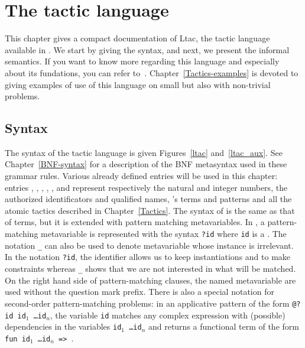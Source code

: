 \chapter[The tactic language]{The tactic language\label{TacticLanguage}}


This chapter gives a compact documentation of Ltac, the tactic
language available in {\Coq}. We start by giving the syntax, and next,
we present the informal semantics. If you want to know more regarding
this language and especially about its fundations, you can refer
to~\cite{Del00}. Chapter~\ref{Tactics-examples} is devoted to giving
examples of use of this language on small but also with non-trivial
problems.


\section{Syntax}

\def\tacexpr{\textrm{\textsl{expr}}}
\def\tacexprlow{\textrm{\textsl{tacexpr$_1$}}}
\def\tacexprinf{\textrm{\textsl{tacexpr$_2$}}}
\def\tacexprpref{\textrm{\textsl{tacexpr$_3$}}}
\def\atom{\textrm{\textsl{atom}}}
\def\recclause{\textrm{\textsl{rec\_clause}}}
\def\letclause{\textrm{\textsl{let\_clause}}}
\def\matchrule{\textrm{\textsl{match\_rule}}}
\def\contextrule{\textrm{\textsl{context\_rule}}}
\def\contexthyps{\textrm{\textsl{context\_hyps}}}
\def\tacarg{\nterm{tacarg}}
\def\cpattern{\nterm{cpattern}}

The syntax of the tactic language is given Figures~\ref{ltac}
and~\ref{ltac_aux}. See Chapter~\ref{BNF-syntax} for a description of
the BNF metasyntax used in these grammar rules. Various already
defined entries will be used in this chapter: entries
{\naturalnumber}, {\integer}, {\ident}, {\qualid}, {\term},
{\cpattern} and {\atomictac} represent respectively the natural and
integer numbers, the authorized identificators and qualified names,
{\Coq}'s terms and patterns and all the atomic tactics described in
Chapter~\ref{Tactics}. The syntax of {\cpattern} is the same as that
of terms, but it is extended with pattern matching metavariables. In
{\cpattern}, a pattern-matching metavariable is represented with the
syntax {\tt ?id} where {\tt id} is a {\ident}. The notation {\tt \_}
can also be used to denote metavariable whose instance is
irrelevant. In the notation {\tt ?id}, the identifier allows us to
keep instantiations and to make constraints whereas {\tt \_} shows
that we are not interested in what will be matched. On the right hand
side of pattern-matching clauses, the named metavariable are used
without the question mark prefix. There is also a special notation for
second-order pattern-matching problems: in an applicative pattern of
the form {\tt @?id id$_1$ \ldots id$_n$}, the variable {\tt id}
matches any complex expression with (possible) dependencies in the
variables {\tt id$_1$ \ldots id$_n$} and returns a functional term of
the form {\tt fun id$_1$ \ldots id$_n$ => {\term}}.


